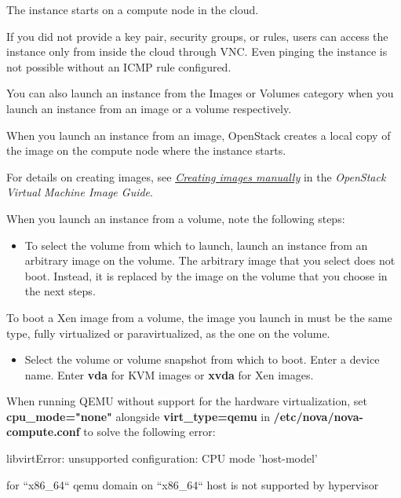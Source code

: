 The instance starts on a compute node in the cloud.

 If you did not provide a key pair, security groups, or
rules, users can access the instance only from inside the cloud
through VNC. Even pinging the instance is not possible without an ICMP
rule configured.

You can also launch an instance from the Images or Volumes category when
you launch an instance from an image or a volume respectively.

When you launch an instance from an image, OpenStack creates a local
copy of the image on the compute node where the instance starts.

For details on creating images, see
\href{https://docs.openstack.org/image-guide/create-images-manually.html}{\emph{Creating
images manually}} in the \emph{OpenStack Virtual Machine Image Guide}.

When you launch an instance from a volume, note the following steps:

\begin{itemize}
\item To select the volume from which to launch, launch an instance from an
  arbitrary image on the volume. The arbitrary image that you select
  does not boot. Instead, it is replaced by the image on the volume that
  you choose in the next steps.
\end{itemize}

To boot a Xen image from a volume, the image you launch in must be the
same type, fully virtualized or paravirtualized, as the one on the
volume.

\begin{itemize}
\item Select the volume or volume snapshot from which to boot. Enter a
  device name. Enter \textbf{vda} for KVM images or \textbf{xvda} for
  Xen images.
\end{itemize}

 When running QEMU without support for the hardware
virtualization, set \textbf{cpu\_mode="none"} alongside
\textbf{virt\_type=qemu} in \textbf{/etc/nova/nova-compute.conf} to
solve the following error:

libvirtError: unsupported configuration: CPU mode 'host-model'

for ``x86\_64`` qemu domain on ``x86\_64`` host is not supported by
hypervisor

\label{connect-to-your-instance-by-using-ssh}

